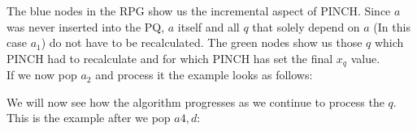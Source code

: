 The blue nodes in the RPG show us the incremental aspect of PINCH. Since $a$ was never inserted into the PQ, $a$ itself and all $q$ that solely depend on $a$ (In this case $a_1$) do not have to be recalculated. The green nodes show us those $q$ which PINCH had to recalculate and for which PINCH has set the final $x_q$ value. \\

If we now pop $a_2$ and process it the example looks as follows:


\begin{center}
\end{center}
\newpage
We will now see how the algorithm progresses as we continue to process the $q$. This is the example after we pop $a4, d$:
